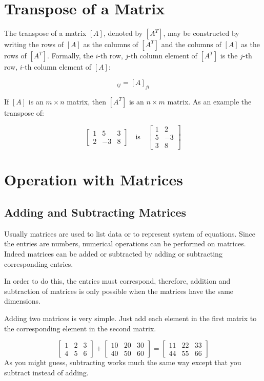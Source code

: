 \section{Transpose of a Matrix}
The transpose of a matrix $[A]$, denoted by $[A^T]$, may be constructed by writing the rows of $[A]$ as the columns of $[A^T]$
and the columns of $[A]$ as the rows of $[A^T]$.
Formally, the $i$-th row, $j$-th column element of $[A^T]$ is the $j$-th row, $i$-th column element of $[A]$:

\begin{equation}[A^T]_{ij} = [A]_{ji}\end{equation}

If $[A]$ is an $m\times n$ matrix, then $[A^T]$ is an $n\times m$ matrix. 
As an example the transpose of:

\[
\begin{bmatrix}
1 & 5 & 3 \\
2 & -3 & 8
\end{bmatrix}
\quad \mathrm{is} \quad
\begin{bmatrix}
1 & 2 \\
5 & -3 \\
3  & 8
\end{bmatrix}
\]

\section{Operation with Matrices}
\subsection{Adding and Subtracting Matrices}\label{adding-and-subtracting-matrices}

Usually matrices are used to list data or to represent system of equations. Since the entries are numbers, numerical operations can be performed on matrices. 
Indeed matrices can be added or subtracted by adding or subtracting corresponding entries.

In order to do this, the entries must correspond, therefore, addition
and subtraction of matrices is only possible when the matrices have the
same dimensions.

Adding two matrices is very simple. Just add each element in the first
matrix to the corresponding element in the second matrix.

\[
\begin{bmatrix}
1 & 2 & 3 \\
4 & 5 & 6
\end{bmatrix}
+
\begin{bmatrix}
10 & 20 & 30\\
40 & 50 & 60
\end{bmatrix}
=
\begin{bmatrix}
11 & 22 & 33\\
44 & 55 & 66
\end{bmatrix}
\]
As you might guess, subtracting works much the same way except that you
subtract instead of adding.

